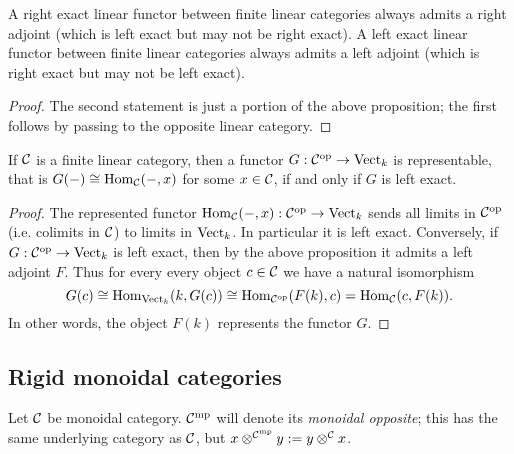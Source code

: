 \documentclass{amsart}
\begin{document}
\begin{corollary}
	A right exact linear functor between finite linear categories always admits a right adjoint (which is left exact but may not be right exact). A left exact linear functor between finite linear categories always admits a left adjoint (which is right exact but may not be left exact). 
\end{corollary}

\begin{proof}
	The second statement is just a portion of the above proposition; the first follows by passing to the opposite linear category.  
\end{proof}

\begin{corollary} \label{cor:representable}
If $\mathcal C$ is a finite linear category, then a functor $G: \mathcal C^\textrm{op} \to \mathrm{Vect}_k$ is representable, that is $G(-) \cong \operatorname{Hom}_{\mathcal C}(-,x)$ for some $x \in \mathcal C$, if and only if $G$ is left exact. 
\end{corollary}

\begin{proof}
	The represented functor $\operatorname{Hom}_{\mathcal C}(-, x):\mathcal C^\text{op} \to \mathrm{Vect}_k$ sends all limits in $\mathcal C^\text{op}$ (i.e. colimits in $\mathcal C$) to limits in $\mathrm{Vect}_k$. In particular it is left exact. 
%
%		
Conversely, if $G: \mathcal C^\text{op} \to \mathrm{Vect}_k$ is left exact, then by the above proposition it admits a left adjoint $F$. Thus for every every object $c \in \mathcal C$ we have a natural isomorphism
	\begin{equation*}
		G(c) \cong \operatorname{Hom}_{\mathrm{Vect}_k}( k, G(c)) \cong \operatorname{Hom}_{\mathcal C^{\mathrm{op}}}( F(k), c) = \operatorname{Hom}_{\mathcal C}(c, F(k) ).
	\end{equation*}
	In other words,  the object $F(k)$ represents the functor $G$. 
\end{proof}

\subsection{Rigid monoidal categories}  


Let $\mathcal C$ be monoidal category. $\mathcal C^{\mathrm{mp}}$ will denote its {\em monoidal opposite}; this has the same underlying category as $\mathcal C$, but $x \otimes^{\mathcal C^{\mathrm{mp}}} y : = y \otimes^{\mathcal C} x$. 
\end{document}
